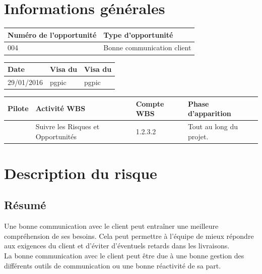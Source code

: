 
\section*{Informations générales}
 
\begin{table}[h]
\centering
	\begin{tabularx}{16.8cm}{|X|X|}
	\hline
	\rowcolor{gray!40} Numéro de l'opportunité & Type d'opportunité \\
	\hline
	004 & Bonne communication client \\
	\hline
	\end{tabularx}
\end{table}

\begin{table}[h]
\centering
	\begin{tabularx}{16.8cm}{|X|X|X|}
	\hline
	 \rowcolor{gray!40} Date & Visa du \RQ & Visa du \CP \\
	\hline
	 29/01/2016 & pgpic & pgpic \\
	\hline
	\end{tabularx}
\end{table}

\begin{table}[h]
\centering
	\begin{tabularx}{16.8cm}{|X|X|X|X|}
	\hline
	\rowcolor{gray!40} Pilote & Activité WBS & Compte WBS & Phase d'apparition \\
	\hline
	 \Florian & Suivre les Risques et Opportunités & 1.2.3.2 & Tout au long du projet.\\
	\hline
	\end{tabularx}
\end{table}

\section*{Description du risque}

\subsection*{Résumé}
	Une bonne communication avec le client peut entraîner une meilleure compréhension de ses besoins. Cela peut permettre à l'équipe \PICCourt de mieux répondre aux exigences du client et d'éviter d'éventuels retards dans les livraisons. \\
        La bonne communication avec le client peut être due à une bonne gestion des différents outils de communication ou une bonne réactivité de sa part.
	
